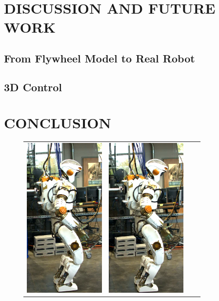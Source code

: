 \documentclass[letterpaper, 10 pt, conference]{ieeeconf}  %
\begin{document}
\section{DISCUSSION AND FUTURE WORK}\label{sec:discussion}
\subsection{From Flywheel Model to Real Robot}
\subsection{3D Control}

\section{CONCLUSION}\label{sec:conclusion}
\begin{figure}[h]
\centering
  \begin{tabular}{cccc}
    \includegraphics[width=1.6in]{val1} &
    \includegraphics[width=1.6in]{val3} &

\end{tabular}
\end{figure}
\end{document}
